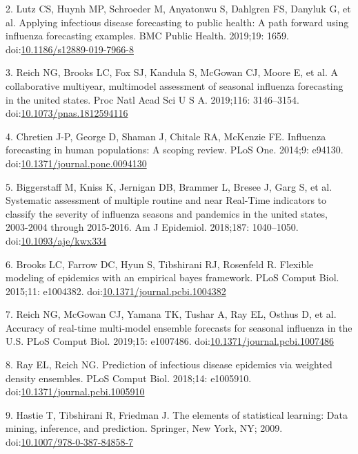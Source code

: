 \documentclass[10pt,letterpaper]{article}
\begin{document}
\leavevmode\hypertarget{ref-Lutz2019-co}{}%
2. Lutz CS, Huynh MP, Schroeder M, Anyatonwu S, Dahlgren FS, Danyluk G,
et al. Applying infectious disease forecasting to public health: A path
forward using influenza forecasting examples. BMC Public Health.
2019;19: 1659.
doi:\href{https://doi.org/10.1186/s12889-019-7966-8}{10.1186/s12889-019-7966-8}

\leavevmode\hypertarget{ref-Reich2019-uk}{}%
3. Reich NG, Brooks LC, Fox SJ, Kandula S, McGowan CJ, Moore E, et al. A
collaborative multiyear, multimodel assessment of seasonal influenza
forecasting in the united states. Proc Natl Acad Sci U S A. 2019;116:
3146--3154.
doi:\href{https://doi.org/10.1073/pnas.1812594116}{10.1073/pnas.1812594116}

\leavevmode\hypertarget{ref-Chretien2014-dy}{}%
4. Chretien J-P, George D, Shaman J, Chitale RA, McKenzie FE. Influenza
forecasting in human populations: A scoping review. PLoS One. 2014;9:
e94130.
doi:\href{https://doi.org/10.1371/journal.pone.0094130}{10.1371/journal.pone.0094130}

\leavevmode\hypertarget{ref-Biggerstaff2018-ns}{}%
5. Biggerstaff M, Kniss K, Jernigan DB, Brammer L, Bresee J, Garg S, et
al. Systematic assessment of multiple routine and near Real-Time
indicators to classify the severity of influenza seasons and pandemics
in the united states, 2003-2004 through 2015-2016. Am J Epidemiol.
2018;187: 1040--1050.
doi:\href{https://doi.org/10.1093/aje/kwx334}{10.1093/aje/kwx334}

\leavevmode\hypertarget{ref-Brooks2015-fl}{}%
6. Brooks LC, Farrow DC, Hyun S, Tibshirani RJ, Rosenfeld R. Flexible
modeling of epidemics with an empirical bayes framework. PLoS Comput
Biol. 2015;11: e1004382.
doi:\href{https://doi.org/10.1371/journal.pcbi.1004382}{10.1371/journal.pcbi.1004382}

\leavevmode\hypertarget{ref-Reich2019-ca}{}%
7. Reich NG, McGowan CJ, Yamana TK, Tushar A, Ray EL, Osthus D, et al.
Accuracy of real-time multi-model ensemble forecasts for seasonal
influenza in the U.S. PLoS Comput Biol. 2019;15: e1007486.
doi:\href{https://doi.org/10.1371/journal.pcbi.1007486}{10.1371/journal.pcbi.1007486}

\leavevmode\hypertarget{ref-Ray2018-ef}{}%
8. Ray EL, Reich NG. Prediction of infectious disease epidemics via
weighted density ensembles. PLoS Comput Biol. 2018;14: e1005910.
doi:\href{https://doi.org/10.1371/journal.pcbi.1005910}{10.1371/journal.pcbi.1005910}

\leavevmode\hypertarget{ref-Hastie2009-ft}{}%
9. Hastie T, Tibshirani R, Friedman J. The elements of statistical
learning: Data mining, inference, and prediction. Springer, New York,
NY; 2009.
doi:\href{https://doi.org/10.1007/978-0-387-84858-7}{10.1007/978-0-387-84858-7}
\end{document}
